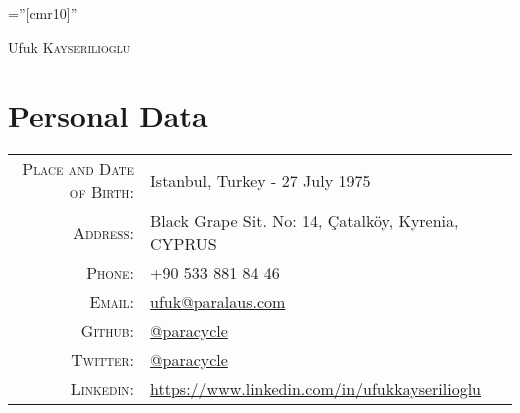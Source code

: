 \documentclass[a4paper,10pt]{article}
\begin{document}
\pagestyle{empty} %

\font\fb=''[cmr10]'' %

\par{\centering
		{\Huge Ufuk \textsc{Kayserilioglu}
	}\bigskip\par}

\section{Personal Data}

\begin{tabular}{rl}
    \textsc{Place and Date of Birth:} & Istanbul, Turkey  - 27 July 1975 \\
    \textsc{Address:}                 & Black Grape Sit. No: 14, Çatalköy, Kyrenia, CYPRUS \\
    \textsc{Phone:}                   & +90 533 881 84 46 \\
    \textsc{Email:}                   & \href{mailto:ufuk@paralaus.com}{ufuk@paralaus.com} \\
    \textsc{Github:}                  & \href{https://github.com/paracycle}{@paracycle} \\
    \textsc{Twitter:}                 & \href{https://twitter.com/paracycle}{@paracycle} \\
    \textsc{Linkedin:}                & \href{https://www.linkedin.com/in/ufukkayserilioglu}{https://www.linkedin.com/in/ufukkayserilioglu} \\
\end{tabular}

\end{document}
